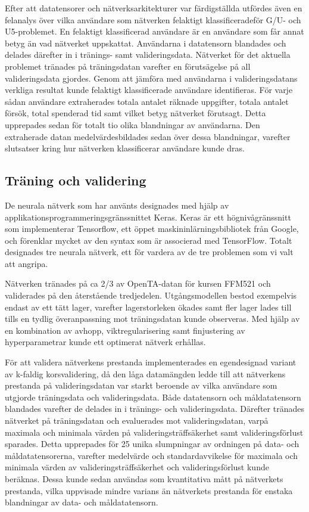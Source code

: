 Efter att datatensorer och nätverksarkitekturer var färdigställda utfördes även en felanalys över vilka användare som nätverken felaktigt klassificeradeför G/U- och U5-problemet. En felaktigt klassificerad användare är en användare som får annat betyg än vad nätverket uppskattat. Användarna i datatensorn blandades och delades därefter in i tränings- samt valideringsdata. Nätverket för det aktuella problemet tränades på träningsdatan varefter en förutsägelse på all valideringsdata gjordes. Genom att jämföra med användarna i valideringsdatans verkliga resultat kunde felaktigt klassificerade användare identifieras. För varje sådan användare extraherades totala antalet räknade uppgifter, totala antalet försök, total spenderad tid samt vilket betyg nätverket förutsagt. Detta upprepades sedan för totalt tio olika blandningar av användarna. Den extraherade datan medelvärdesbildades sedan över dessa blandningar, varefter slutsatser kring hur nätverken klassificerar användare kunde dras. 

\subsection{Träning och validering}

De neurala nätverk som har använts designades med hjälp av applikationsprogrammeringsgränssnittet Keras. Keras är ett högnivågränssnitt som implementerar Tensorflow, ett öppet maskininlärningsbibliotek från Google, och förenklar mycket av den syntax som är associerad med TensorFlow. Totalt designades tre neurala nätverk, ett för vardera av de tre problemen som vi valt att angripa. 

Nätverken tränades på ca 2/3 av OpenTA-datan för kursen FFM521 och validerades på den återstående tredjedelen. Utgångsmodellen bestod exempelvis endast av ett tätt lager, varefter lagerstorleken ökades samt fler lager lades till tills en tydlig överanpassning mot träningsdatan kunde observeras. Med hjälp av en kombination av avhopp, viktregularisering samt finjustering av hyperparametrar kunde ett optimerat nätverk erhållas.

För att validera nätverkens prestanda implementerades en egendesignad variant av k-faldig korsvalidering, då den låga datamängden ledde till att nätverkens prestanda på valideringsdatan var starkt beroende av vilka användare som utgjorde träningsdata och valideringsdata. Både datatensorn och måldatatensorn blandades varefter de delades in i tränings- och valideringsdata. Därefter tränades nätverket på träningsdatan och evaluerades mot valideringsdatan, varpå maximala och minimala värden på valideringsträffsäkerhet samt valideringsförlust sparades. Detta upprepades för 25 unika slumpningar av ordningen på data- och måldatatensorerna, varefter medelvärde och standardavvikelse för maximala och minimala värden av valideringsträffsäkerhet och valideringsförlust kunde beräknas. Dessa kunde sedan användas som kvantitativa mått på nätverkets prestanda, vilka uppvisade mindre varians än nätverkets prestanda för enstaka blandningar av data- och måldatatensorn.

